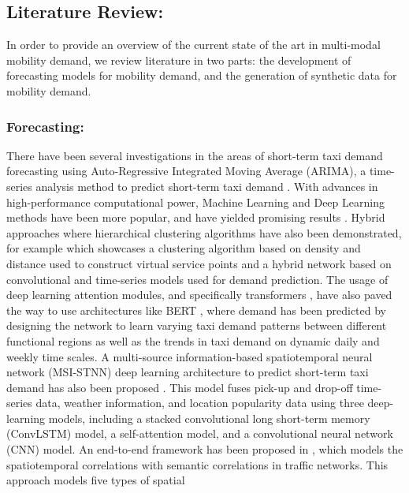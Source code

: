 \documentclass[conference]{IEEEtran}
\begin{document}
\subsection{Literature Review:}
In order to provide an overview of the current state of the art in multi-modal mobility demand, we 
review literature in two parts: the development of forecasting models for mobility demand, and the 
generation of synthetic data for mobility demand. 

\subsubsection*{Forecasting:}
There have been several investigations in the areas of short-term taxi demand forecasting using 
Auto-Regressive Integrated Moving Average (ARIMA), a time-series analysis method to predict short-term 
taxi demand \cite{moreira-matias_predicting_2013}. With advances in high-performance computational power, 
Machine Learning and Deep Learning methods \cite{uhrig_sparsity_2017} have been more popular, and have 
yielded promising results \cite{zhang_mlrnn_2022} \cite{hong_spatiotemporal_2021} \cite{liu_improved_2020} 
\cite{rodrigues_beyond_2020} \cite{lai_taxi_2019}. Hybrid approaches where hierarchical clustering algorithms 
have also been demonstrated, for example which showcases a clustering algorithm based on density and distance 
used to construct virtual service 
points and a hybrid network based on convolutional and time-series models used for demand prediction. 
The usage of deep learning attention modules, and specifically transformers \cite{vaswani_attention_2017},
have also paved the way to use architectures like BERT \cite{cao_bert-based_2022}, where demand has been 
predicted by designing the network to learn varying taxi demand patterns between different functional 
regions as 
well as the trends in taxi demand on dynamic daily and weekly time scales. A multi-source 
information-based spatiotemporal  neural network (MSI-STNN) deep learning architecture to predict 
short-term taxi demand has also been  proposed \cite{chen_multi-source_2021}. This model fuses pick-up and 
drop-off time-series data, weather information, 
and location popularity data using three deep-learning models, including a stacked convolutional long 
short-term memory (ConvLSTM) model, a self-attention model, and a convolutional neural network (CNN) 
model. An end-to-end framework has been proposed in \cite{hong_spatiotemporal_2021}, which models the 
spatiotemporal 
correlations with semantic correlations in traffic networks. This approach models five types of spatial 
\end{document}
